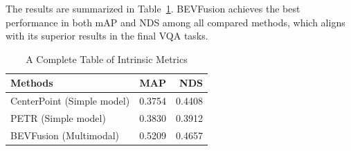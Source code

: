 \documentclass{article} %
\begin{document}
The results are summarized in Table~\ref{tab:intrinsic}. BEVFusion achieves the best performance in both mAP and NDS among all compared methods, which aligns with its superior results in the final VQA tasks.


\begin{table}[H]
\centering
\begin{tabular}{@{}lrr@{}}
\toprule
Methods & MAP & NDS  \\
\midrule
CenterPoint (Simple model)   & 0.3754 & 0.4408 \\
PETR (Simple model)         & 0.3830 & 0.3912 \\
BEVFusion (Multimodal)            & 0.5209 & 0.4657 \\
\bottomrule
\end{tabular}
\caption{A Complete Table of Intrinsic Metrics}
\label{tab:intrinsic}
\end{table}







\end{document}
